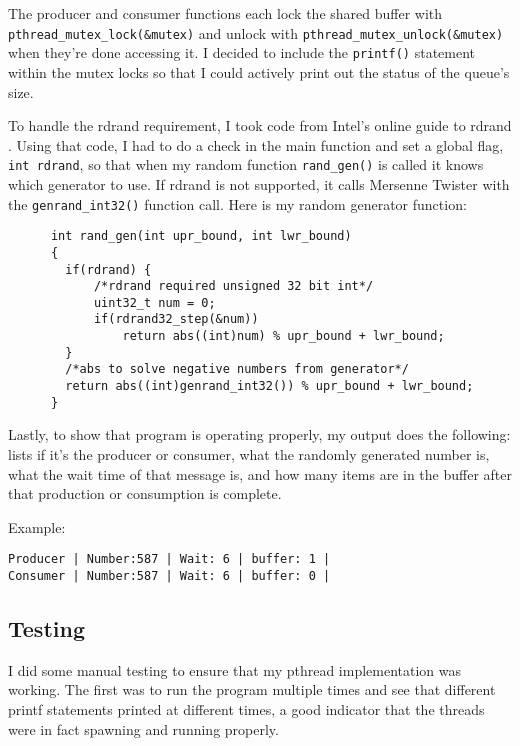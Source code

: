 \documentclass[10pt,letterpaper]{article}
\begin{document}
    \noindent The producer and consumer functions each lock the shared buffer
    with \texttt{pthread\_mutex\_lock(\&mutex)} and unlock with
    \texttt{pthread\_mutex\_unlock(\&mutex)} when they're done accessing it.
    I decided to include the \texttt{printf()} statement within the mutex locks
    so that I could actively print out the status of the queue's size.

    \noindent To handle the rdrand requirement, I took code from Intel's online
    guide to rdrand \cite{johnm.2014}. Using that code, I had to do a check in
    the main function and set a global flag, \texttt{int rdrand}, so that when
    my random function \texttt{rand\_gen()} is called it knows which generator
    to use. If rdrand is not supported, it calls Mersenne Twister with the
    \texttt{genrand\_int32()} function call. Here is my random generator function:

    \begin{lstlisting}
      int rand_gen(int upr_bound, int lwr_bound)
      {
      	if(rdrand) {
      		/*rdrand required unsigned 32 bit int*/
      		uint32_t num = 0;
      		if(rdrand32_step(&num))
      			return abs((int)num) % upr_bound + lwr_bound;
      	}
      	/*abs to solve negative numbers from generator*/
      	return abs((int)genrand_int32()) % upr_bound + lwr_bound;
      }
    \end{lstlisting}

    \noindent Lastly, to show that program is operating properly, my output does
    the following: lists if it's the producer or consumer, what the randomly
    generated number is, what the wait time of that message is, and how many items
    are in the buffer after that production or consumption is complete.


    \noindent Example:

    \noindent \texttt{Producer | Number:587 | Wait: 6 | buffer:  1 |} \\
    \texttt{Consumer | Number:587 | Wait: 6 | buffer:  0 |}

  \subsection{Testing}
  I did some manual testing to ensure that my pthread implementation was working.
  The first was to run the program multiple times and see that different printf
  statements printed at different times, a good indicator that the threads were
  in fact spawning and running properly.
\end{document}
